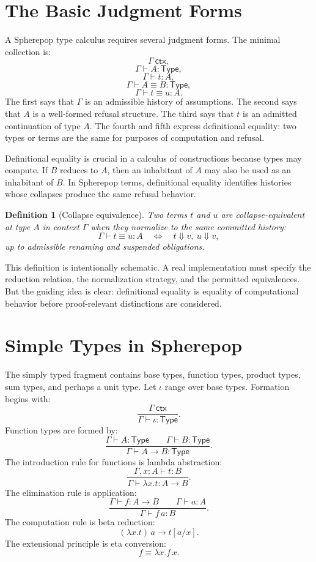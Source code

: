 \documentclass[12pt,oneside]{article}
\newtheorem{definition}{Definition}[section]
\newcommand{\Type}{\mathsf{Type}}
\newcommand{\eval}{\Downarrow}
\newcommand{\step}{\longrightarrow}
\newcommand{\judges}{\vdash}
\newcommand{\defeq}{\equiv}
\begin{document}
\section{The Basic Judgment Forms}

A Spherepop type calculus requires several judgment forms. The minimal collection is:
\[
\Gamma \ \mathsf{ctx},
\]
\[
\Gamma \judges A : \Type,
\]
\[
\Gamma \judges t : A,
\]
\[
\Gamma \judges A \defeq B : \Type,
\]
\[
\Gamma \judges t \defeq u : A.
\]
The first says that $\Gamma$ is an admissible history of assumptions. The second says that $A$ is a well-formed refusal structure. The third says that $t$ is an admitted continuation of type $A$. The fourth and fifth express definitional equality: two types or terms are the same for purposes of computation and refusal.

Definitional equality is crucial in a calculus of constructions because types may compute. If $B$ reduces to $A$, then an inhabitant of $A$ may also be used as an inhabitant of $B$. In Spherepop terms, definitional equality identifies histories whose collapses produce the same refusal behavior.

\begin{definition}[Collapse equivalence]
Two terms $t$ and $u$ are collapse-equivalent at type $A$ in context $\Gamma$ when they normalize to the same committed history:
\[
\Gamma \judges t \defeq u : A
\quad \Longleftrightarrow \quad
t \eval v,\ u \eval v,
\]
up to admissible renaming and suspended obligations.
\end{definition}

This definition is intentionally schematic. A real implementation must specify the reduction relation, the normalization strategy, and the permitted equivalences. But the guiding idea is clear: definitional equality is equality of computational behavior before proof-relevant distinctions are considered.

\section{Simple Types in Spherepop}

The simply typed fragment contains base types, function types, product types, sum types, and perhaps a unit type. Let $\iota$ range over base types. Formation begins with:
\[
\frac{\Gamma \ \mathsf{ctx}}
{\Gamma \judges \iota : \Type}.
\]
Function types are formed by:
\[
\frac{\Gamma \judges A : \Type \qquad \Gamma \judges B : \Type}
{\Gamma \judges A \to B : \Type}.
\]
The introduction rule for functions is lambda abstraction:
\[
\frac{\Gamma,x:A \judges t : B}
{\Gamma \judges \lambda x.t : A \to B}.
\]
The elimination rule is application:
\[
\frac{\Gamma \judges f : A \to B \qquad \Gamma \judges a : A}
{\Gamma \judges f\,a : B}.
\]
The computation rule is beta reduction:
\[
(\lambda x.t)\,a \step t[a/x].
\]
The extensional principle is eta conversion:
\[
f \defeq \lambda x. f\,x.
\]
\end{document}
